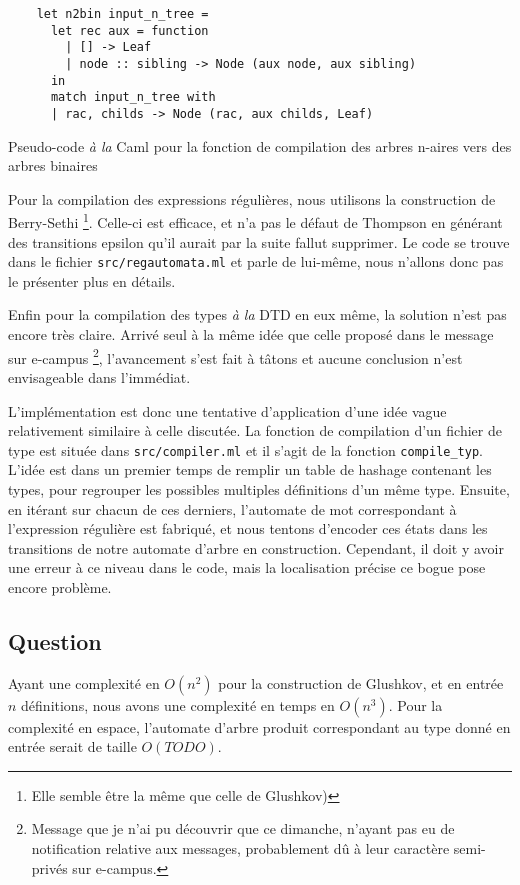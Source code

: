 \documentclass[twoside,12pt]{article}
\begin{document}
\begin{algorithm}
    \bigskip
\begin{verbatim}
    let n2bin input_n_tree =
      let rec aux = function
        | [] -> Leaf
        | node :: sibling -> Node (aux node, aux sibling)
      in
      match input_n_tree with
      | rac, childs -> Node (rac, aux childs, Leaf)
\end{verbatim}
   \caption{\small Pseudo-code \textit{à la} Caml pour la fonction de compilation des arbres
   n-aires vers des arbres binaires}
\end{algorithm}

Pour la compilation des expressions régulières, nous utilisons la construction
de Berry-Sethi \footnote{Elle semble être la même que celle de Glushkov)}.
Celle-ci est efficace, et n'a pas le défaut de Thompson en générant des transitions
epsilon qu'il aurait par la suite fallut supprimer.
Le code se trouve dans le fichier \texttt{src/regautomata.ml} et parle de lui-même, nous n'allons
donc pas le présenter plus en détails.

Enfin pour la compilation des types \textit{à la} DTD en eux même,
la solution n'est pas encore très claire. Arrivé seul à la même idée
que celle proposé dans le message sur e-campus
\footnote{Message que je n'ai pu découvrir que ce dimanche, n'ayant
pas eu de notification relative aux messages, probablement dû à leur
caractère \og semi-privés \fg{} sur e-campus.},
l'avancement s'est fait à tâtons et aucune conclusion n'est envisageable dans l'immédiat.

L'implémentation est donc une tentative d'application d'une idée vague relativement similaire à
celle discutée. La fonction de compilation d'un fichier de type est située dans
\texttt{src/compiler.ml} et il s'agit de la fonction \texttt{compile\_typ}.
L'idée est dans un premier temps de remplir un table de hashage contenant les types, pour
regrouper les possibles multiples définitions d'un même type. Ensuite, en itérant sur chacun
de ces derniers, l'automate de mot correspondant à l'expression régulière est fabriqué, et
nous tentons d'encoder ces états dans les transitions de notre automate d'arbre en construction.
Cependant, il doit y avoir une erreur à ce niveau dans le code, mais la localisation précise
ce bogue pose encore problème.



\subsection{Question}
Ayant une complexité en $O(n^2)$ pour la construction de Glushkov, et en entrée $n$ définitions,
nous avons une complexité en temps en $O(n^3)$\footnotemark.
Pour la complexité en espace, l'automate d'arbre produit correspondant
au type donné en entrée serait de taille $O(TODO)$.


\end{document}
